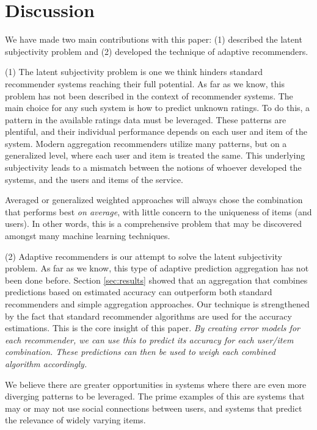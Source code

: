 \section{Discussion}
\label{sec:discussion}

We have made two main contributions with this paper:
(1) described the latent subjectivity problem and
(2) developed the technique of adaptive recommenders.

(1) The latent subjectivity problem is one we think hinders
standard recommender systems reaching their full potential.
As far as we know, this problem has not been described
in the context of recommender systems.
The main choice for any such system is how to predict unknown ratings.
To do this, a pattern in the available ratings data must be leveraged.
These patterns are plentiful, and their individual performance
depends on each user and item of the system.
Modern aggregation recommenders utilize many patterns, but on a generalized
level, where each user and item is treated the same.
This underlying subjectivity leads to a mismatch between the notions
of whoever developed the systems, and the users and items of the service.

Averaged or generalized weighted approaches will always
chose the combination that performs best \emph{on average},
with little concern to the uniqueness of items (and users).
In other words, this is a comprehensive problem
that may be discovered amongst many machine learning techniques.

(2) Adaptive recommenders is our attempt to solve the latent subjectivity problem.
As far as we know, this type of adaptive prediction aggregation has not been done before.
Section \ref{sec:results} showed that an aggregation that combines predictions based
on estimated accuracy can outperform both standard recommenders and simple aggregation approaches.
Our technique is strengthened by the fact that standard recommender algorithms
are used for the accuracy estimations.
This is the core insight of this paper.
\emph{By creating error models for each recommender, we can use this to predict
its accuracy for each user/item combination.
These predictions can then be used to weigh each combined algorithm accordingly.}

We believe there are greater opportunities in systems where there  are even more diverging
patterns to be leveraged. The prime examples of this are systems that may or may 
not use social connections between users, and systems that predict the 
relevance of widely varying items.

